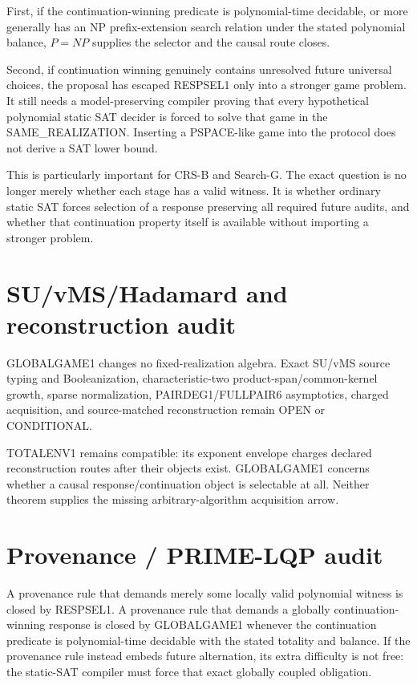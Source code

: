 \documentclass[11pt]{article}
\begin{document}
First, if the continuation-winning predicate is polynomial-time decidable, or more generally has an NP prefix-extension search relation under the stated polynomial balance, \(P=NP\) supplies the selector and the causal route closes.

Second, if continuation winning genuinely contains unresolved future universal choices, the proposal has escaped RESPSEL1 only into a stronger game problem. It still needs a model-preserving compiler proving that every hypothetical polynomial static SAT decider is forced to solve that game in the SAME\_REALIZATION. Inserting a PSPACE-like game into the protocol does not derive a SAT lower bound.

This is particularly important for CRS-B and Search-G. The exact question is no longer merely whether each stage has a valid witness. It is whether ordinary static SAT forces selection of a response preserving all required future audits, and whether that continuation property itself is available without importing a stronger problem.

\section*{SU/vMS/Hadamard and reconstruction audit}
GLOBALGAME1 changes no fixed-realization algebra. Exact SU/vMS source typing and Booleanization, characteristic-two product-span/common-kernel growth, sparse normalization, PAIRDEG1/FULLPAIR6 asymptotics, charged acquisition, and source-matched reconstruction remain OPEN or CONDITIONAL.

TOTALENV1 remains compatible: its exponent envelope charges declared reconstruction routes after their objects exist. GLOBALGAME1 concerns whether a causal response/continuation object is selectable at all. Neither theorem supplies the missing arbitrary-algorithm acquisition arrow.

\section*{Provenance / PRIME-LQP audit}
A provenance rule that demands merely some locally valid polynomial witness is closed by RESPSEL1. A provenance rule that demands a globally continuation-winning response is closed by GLOBALGAME1 whenever the continuation predicate is polynomial-time decidable with the stated totality and balance. If the provenance rule instead embeds future alternation, its extra difficulty is not free: the static-SAT compiler must force that exact globally coupled obligation.
\end{document}
